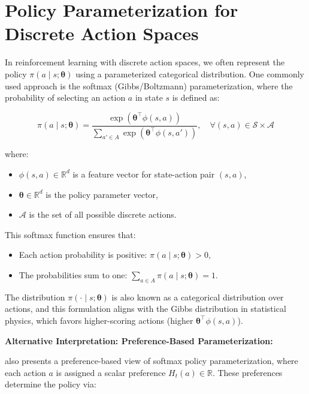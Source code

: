 \section{Policy Parameterization for Discrete Action Spaces}

In reinforcement learning with discrete action spaces, we often represent the policy \( \pi(a \mid s; \boldsymbol{\theta}) \) using a parameterized categorical distribution. One commonly used approach is the softmax (Gibbs/Boltzmann) parameterization, where the probability of selecting an action \( a \) in state \( s \) is defined as:

\[
\pi(a \mid s; \boldsymbol{\theta}) = \frac{\exp(\boldsymbol{\theta}^\top \phi(s, a))}{\sum_{a' \in A} \exp(\boldsymbol{\theta}^\top \phi(s, a'))}, \quad \forall (s,a) \in \mathcal{S} \times \mathcal{A} 
\]

where:
\begin{itemize}
    \item \( \phi(s, a) \in \mathbb{R}^d \) is a feature vector for state-action pair \( (s, a) \),
    \item \( \boldsymbol{\theta} \in \mathbb{R}^d \) is the policy parameter vector,
    \item \( \mathcal{A} \) is the set of all possible discrete actions.
\end{itemize}

This softmax function ensures that:
\begin{itemize}
    \item Each action probability is positive: \( \pi(a \mid s; \boldsymbol{\theta}) > 0 \),
    \item The probabilities sum to one: \( \sum_{a \in A} \pi(a \mid s; \boldsymbol{\theta}) = 1 \).
\end{itemize}

The distribution \( \pi(\cdot \mid s; \boldsymbol{\theta}) \) is also known as a categorical distribution over actions, and this formulation aligns with the Gibbs distribution in statistical physics, which favors higher-scoring actions (higher \( \boldsymbol{\theta}^\top \phi(s, a) \)).

\textbf{Alternative Interpretation: Preference-Based Parameterization:}

\cite{sutton2018reinforcement} also presents a preference-based view of softmax policy parameterization, where each action \( a \) is assigned a scalar preference \( H_t(a) \in \mathbb{R} \). These preferences determine the policy via:

